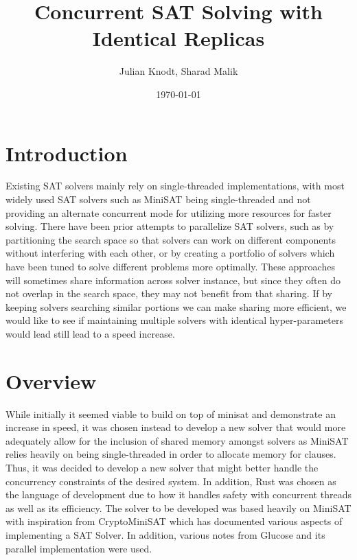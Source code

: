\documentclass[11pt]{extarticle}
\title{Concurrent SAT Solving with Identical Replicas}
\author{Julian Knodt, Sharad Malik}
\date{\today}
\begin{document}
\maketitle


\section*{Introduction}
Existing SAT solvers mainly rely on single-threaded implementations, with most widely used SAT
solvers such as MiniSAT being single-threaded and not providing an alternate concurrent mode for
utilizing more resources for faster solving. There have been prior attempts to parallelize SAT
solvers, such as by partitioning the search space so that solvers can work on different
components without interfering with each other, or by creating a portfolio of solvers which have
been tuned to solve different problems more optimally. These approaches will sometimes share
information across solver instance, but since they often do not overlap in the search space,
they may not benefit from that sharing. If by keeping solvers searching similar portions we can
make sharing more efficient, we would like to see if maintaining multiple solvers with identical
hyper-parameters would lead still lead to a speed increase.
\section*{Overview}
While initially it seemed viable to build on top of minisat and demonstrate an increase in
speed, it was chosen instead to develop a new solver that would more adequately allow for the
inclusion of shared memory amongst solvers as MiniSAT relies heavily on being single-threaded in
order to allocate memory for clauses. Thus, it was decided to develop a new solver that might
better handle the concurrency constraints of the desired system. In addition, Rust was chosen as
the language of development due to how it handles safety with concurrent threads as well as its
efficiency. The solver to be developed was based heavily on MiniSAT\cite{minisat} with inspiration
from CryptoMiniSAT\cite{cryptoms} which has documented various aspects of implementing a SAT
Solver. In addition, various notes from Glucose\cite{glucose} and its parallel implementation were used.
\end{document}
